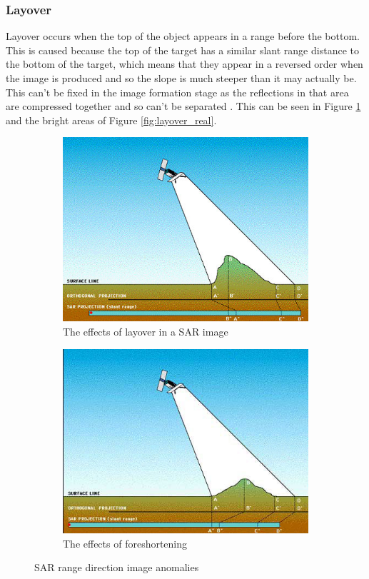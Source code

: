 \subsubsection{Layover}
Layover occurs when the top of the object appears in a range before the bottom. This is caused because the top of the target has a similar slant range distance to the bottom of the target, which means that they appear in a reversed order when the image is produced and so the slope is much steeper than it may actually be. This can't be fixed in the image formation stage as the reflections in that area are compressed together and so can't be separated \cite{ForeshorteningLayover}. This can be seen in Figure \ref{fig:layover} and the bright areas of Figure \ref{fig:layover_real}.


\begin{figure}
	\centering
	\begin{subfigure}{.5\textwidth}
		\centering
		\includegraphics[width=0.9\linewidth]{../figures/esa_layover}
		\caption{The effects of layover in a SAR image}
		\label{fig:layover}
	\end{subfigure}%
	\begin{subfigure}{.5\textwidth}
		\centering
		\includegraphics[width=0.9\linewidth]{../figures/esa_foreshortening}	
		\caption{The effects of foreshortening}
		\label{fig:foreshortening}
	\end{subfigure}
	\caption{SAR range direction image anomalies \cite{ForeshorteningLayover}}
\end{figure}

